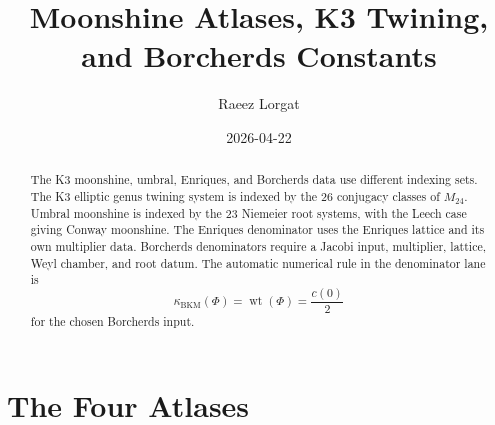 \documentclass[11pt]{article}
\title{Moonshine Atlases, K3 Twining, and Borcherds Constants}
\author{Raeez Lorgat}
\date{2026-04-22}
\providecommand{\kBKM}{\kappa_{\mathrm{BKM}}}
\providecommand{\wt}{\operatorname{wt}}
\begin{document}
\maketitle

\begin{abstract}
The K3 moonshine, umbral, Enriques, and Borcherds data use different
indexing sets.  The K3 elliptic genus twining system is indexed by the
26 conjugacy classes of \(M_{24}\).  Umbral moonshine is indexed by the
23 Niemeier root systems, with the Leech case giving Conway moonshine.
The Enriques denominator uses the Enriques lattice and its own
multiplier data.  Borcherds denominators require a Jacobi input,
multiplier, lattice, Weyl chamber, and root datum.  The automatic
numerical rule in the denominator lane is
\[
  \kBKM(\Phi)=\wt(\Phi)=\frac{c(0)}2
\]
for the chosen Borcherds input.
\end{abstract}

\section{The Four Atlases}
\end{document}
